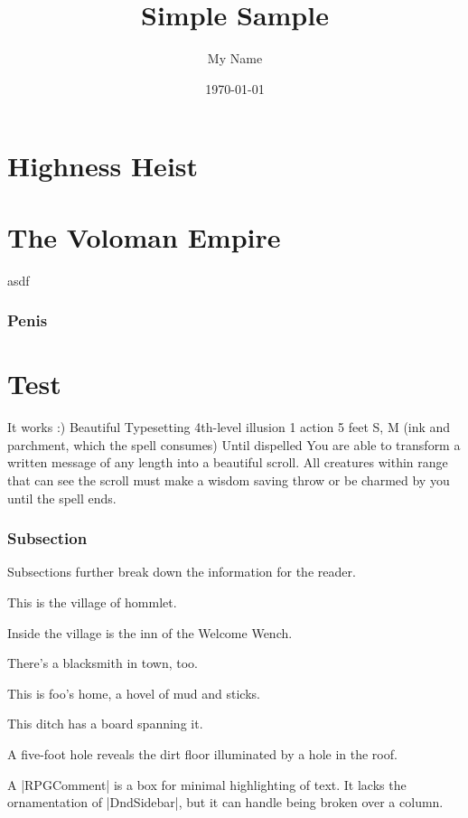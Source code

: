 \documentclass[letterpaper,twocolumn,openany]{memoir}
\title{Simple Sample} %
\author{My Name} %
\date{\today} %
\begin{document}
\tableofcontents

\chapter{Highness Heist}

\lipsum


\chapter{The Voloman Empire}

asdf

\subsection{Penis}
\lipsum

\chapter{Test}
It works :)
\RPGSpellHeader
	{Beautiful Typesetting}
	{4th-level illusion}
	{1 action}
	{5 feet}
	{S, M (ink and parchment, which the spell consumes)}
	{Until dispelled}
You are able to transform a written message of any length into a beautiful scroll. All creatures within range that can see the scroll must make a wisdom saving throw or be charmed by you until the spell ends.

\subsection{Subsection}
Subsections further break down the information for the reader.

 \label{hommlet-village}
This is the village of hommlet.

Inside the village is the inn of the Welcome Wench.

There's a blacksmith in town, too.

This is foo's home, a hovel of mud and sticks.

This ditch has a board spanning it.

A five-foot hole reveals the dirt floor illuminated by a hole in the roof.

\begin{RPGComment}
	A |RPGComment| is a box for minimal highlighting of text. It lacks the ornamentation of |DndSidebar|, but it can handle being broken over a column.
\end{RPGComment}
\end{document}

